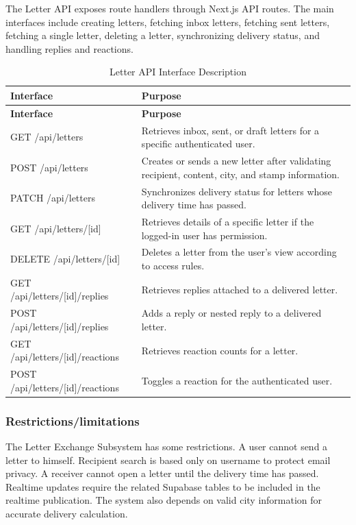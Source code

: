 ﻿\documentclass[12pt,a4paper]{report}
\begin{document}
The Letter API exposes route handlers through Next.js API routes. The main interfaces include creating letters, fetching inbox letters, fetching sent letters, fetching a single letter, deleting a letter, synchronizing delivery status, and handling replies and reactions.

\begin{longtable}{p{4cm} p{10cm}}
\caption{Letter API Interface Description}
\label{tab:letter_api_interface}\\
\toprule
\textbf{Interface} & \textbf{Purpose} \\
\midrule
\endfirsthead
\toprule
\textbf{Interface} & \textbf{Purpose} \\
\midrule
\endhead
GET /api/letters & Retrieves inbox, sent, or draft letters for a specific authenticated user. \\
POST /api/letters & Creates or sends a new letter after validating recipient, content, city, and stamp information. \\
PATCH /api/letters & Synchronizes delivery status for letters whose delivery time has passed. \\
GET /api/letters/[id] & Retrieves details of a specific letter if the logged-in user has permission. \\
DELETE /api/letters/[id] & Deletes a letter from the user's view according to access rules. \\
GET /api/letters/[id]/replies & Retrieves replies attached to a delivered letter. \\
POST /api/letters/[id]/replies & Adds a reply or nested reply to a delivered letter. \\
GET /api/letters/[id]/reactions & Retrieves reaction counts for a letter. \\
POST /api/letters/[id]/reactions & Toggles a reaction for the authenticated user. \\
\bottomrule
\end{longtable}

\subsubsection{Restrictions/limitations}

The Letter Exchange Subsystem has some restrictions. A user cannot send a letter to himself. Recipient search is based only on username to protect email privacy. A receiver cannot open a letter until the delivery time has passed. Realtime updates require the related Supabase tables to be included in the realtime publication. The system also depends on valid city information for accurate delivery calculation.
\end{document}
